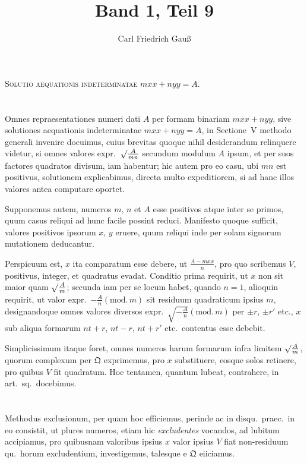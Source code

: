 \documentclass[12pt,a4paper]{article}
\title{Band 1, Teil 9}
\author{Carl Friedrich Gau\ss}
\date{}
\theoremstyle{plain}
\theoremstyle{definition}
\theoremstyle{remark}
\newcommand{\Q}{\mathfrak{Q}}
\begin{document}
\maketitle
\thispagestyle{empty}

\noindent\textsc{Solutio aequationis indeterminatae} $mxx+nyy=A$.

\setcounter{section}{322}

\section{}

Omnes repraesentationes numeri dati $A$ per formam binariam $mxx+nyy$, sive solutiones aequationis indeterminatae $mxx+nyy=A$, in Sectione~V methodo generali invenire docuimus, cuius brevitas quoque nihil desiderandum relinquere videtur, si omnes valores expr.~$\surd\frac{A}{mn}$ secundum modulum $A$ ipsum, et per suos factores quadratos divisum, iam habentur; hic autem pro eo casu, ubi $mn$ est positivus, solutionem explicabimus, directa multo expeditiorem, si ad hanc illos valores antea computare oportet.

Supponemus autem, numeros $m$, $n$ et $A$ esse positivos atque inter se primos, quum casus reliqui ad hunc facile possint reduci. Manifesto quoque sufficit, valores positivos ipsorum $x$, $y$ eruere, quum reliqui inde per solam signorum mutationem deducantur.

Perspicuum est, $x$ ita comparatum esse debere, ut $\frac{A-mxx}{n}$, pro quo scribemus $V$, positivus, integer, et quadratus evadat. Conditio prima requirit, ut $x$ non sit maior quam $\surd\frac{A}{m}$; secunda iam per se locum habet, quando $n=1$, alioquin requirit, ut valor expr.~$-\frac{A}{n}(\mathrm{mod.}\,m)$ sit residuum quadraticum ipsius $m$, designandoque omnes valores diversos expr.~$\surd{-\frac{A}{n}}(\mathrm{mod.}\,m)$ per $\pm r$, $\pm r'$ etc., $x$ sub aliqua formarum $nt+r$, $nt-r$, $nt+r'$ etc.\ contentus esse debebit.

Simplicissimum itaque foret, omnes numeros harum formarum infra limitem $\surd\frac{A}{m}$, quorum complexum per $\Q$ exprimemus, pro $x$ substituere, eosque solos retinere, pro quibus $V$ fit quadratum. Hoc tentamen, quantum lubeat, contrahere, in art.\ sq.\ docebimus.

\section{}

Methodus exclusionum, per quam hoc efficiemus, perinde ac in disqu.\ praec.\ in eo consistit, ut plures numeros, etiam hic \emph{excludentes} vocandos, ad lubitum accipiamus, pro quibusnam valoribus ipsius $x$ valor ipsius $V$ fiat non-residuum qu.\ horum excludentium, investigemus, talesque e $\Q$ eiiciamus.
\end{document}

